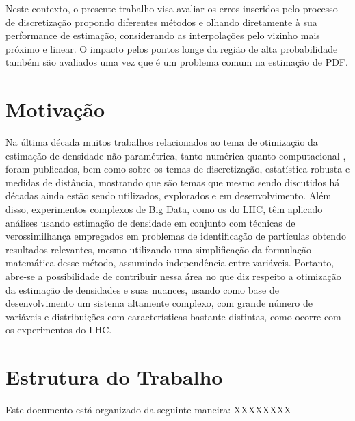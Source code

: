 

 Neste contexto, o presente trabalho visa avaliar os erros inseridos pelo processo de discretização propondo diferentes métodos e olhando diretamente à sua performance de estimação, considerando as interpolações pelo vizinho mais próximo e linear. O impacto pelos pontos longe da região de alta probabilidade também são avaliados uma vez que é um problema comum na estimação de \ac{PDF}.

\section{Motivação}

Na última década muitos trabalhos relacionados ao tema de otimização da estimação de densidade não paramétrica, tanto numérica \cite{schindler2012bandwidth} quanto computacional \cite{gramacki2017nonparametric}, foram publicados, bem como sobre os temas de discretização, estatística robusta e medidas de distância, mostrando que são temas que mesmo sendo discutidos há décadas ainda estão sendo utilizados, explorados e em desenvolvimento. Além disso, experimentos complexos de Big Data, como os do LHC, têm aplicado análises usando estimação de densidade em conjunto com técnicas de verossimilhança empregados em problemas de identificação de partículas obtendo resultados relevantes, mesmo utilizando uma simplificação da formulação matemática desse método, assumindo independência entre variáveis. Portanto, abre-se a possibilidade de contribuir nessa área no que diz respeito a otimização da estimação de densidades e suas nuances, usando como base de desenvolvimento um sistema altamente complexo, com grande número de variáveis e distribuições com características bastante distintas, como ocorre com os experimentos do \ac{LHC}. 

\section{Estrutura do Trabalho}
Este documento está organizado da seguinte maneira: XXXXXXXX

